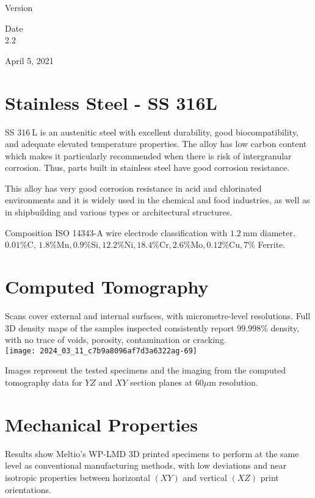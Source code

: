 \documentclass[10pt]{article}
\begin{document}
Version

Date\\
2.2

April 5, 2021

\section*{Stainless Steel - SS 316L}
SS $316 \mathrm{~L}$ is an austenitic steel with excellent durability, good biocompatibility, and adequate elevated temperature properties. The alloy has low carbon content which makes it particularly recommended when there is risk of intergranular corrosion. Thus, parts built in stainless steel have good corrosion resistance.

This alloy has very good corrosion resistance in acid and chlorinated environments and it is widely used in the chemical and food industries, as well as in shipbuilding and various types or architectural structures.

Composition ISO 14343-A wire electrode classification with $1.2 \mathrm{~mm}$ diameter. $0.01 \% \mathrm{C}$, $1.8 \% \mathrm{Mn}, 0.9 \% \mathrm{Si}, 12.2 \% \mathrm{Ni}, 18.4 \% \mathrm{Cr}, 2.6 \% \mathrm{Mo}, 0.12 \% \mathrm{Cu}, 7 \%$ Ferrite.

\section*{Computed Tomography}
Scans cover external and internal surfaces, with micrometre-level resolutions. Full 3D density maps of the samples inspected consistently report $99.998 \%$ density, with no trace of voids, porosity, contamination or cracking.\\
\texttt{[image: 2024\_03\_11\_c7b9a8096af7d3a6322ag-69]}

Images represent the tested specimens and the imaging from the computed tomography data for $Y Z$ and $X Y$ section planes at $60 \mu \mathrm{m}$ resolution.

\section*{Mechanical Properties}
Results show Meltio's WP-LMD 3D printed specimens to perform at the same level as conventional manufacturing methods, with low deviations and near isotropic properties between horizontal $(X Y)$ and vertical $(X Z)$ print orientations.
\end{document}
